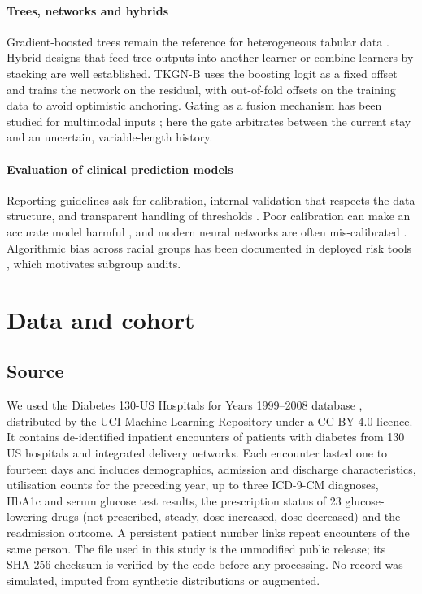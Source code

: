 \documentclass[preprint,12pt,authoryear]{elsarticle}
\begin{document}
\paragraph{Trees, networks and hybrids}
Gradient-boosted trees \citep{friedman2001,chen2016xgboost,ke2017lightgbm}
remain the reference for heterogeneous tabular data
\citep{grinsztajn2022}. Hybrid designs that feed tree outputs into another
learner \citep{he2014facebook} or combine learners by stacking
\citep{wolpert1992} are well established. TKGN-B uses the boosting logit
as a fixed offset and trains the network on the residual, with
out-of-fold offsets on the training data to avoid optimistic anchoring.
Gating as a fusion mechanism has been studied for multimodal inputs
\citep{arevalo2017gmu}; here the gate arbitrates between the current stay
and an uncertain, variable-length history.

\paragraph{Evaluation of clinical prediction models}
Reporting guidelines ask for calibration, internal validation that
respects the data structure, and transparent handling of thresholds
\citep{collins2015tripod}. Poor calibration can make an accurate model
harmful \citep{vancalster2019}, and modern neural networks are often
mis-calibrated \citep{guo2017}. Algorithmic bias across racial groups has
been documented in deployed risk tools \citep{obermeyer2019}, which
motivates subgroup audits.

\section{Data and cohort}
\label{sec:data}

\subsection{Source}
We used the Diabetes 130-US Hospitals for Years 1999--2008 database
\citep{strack2014,uci296}, distributed by the UCI Machine Learning
Repository under a CC BY 4.0 licence. It contains \NRaw{} de-identified
inpatient encounters of patients with diabetes from 130 US hospitals and
integrated delivery networks. Each encounter lasted one to fourteen days
and includes demographics, admission and discharge characteristics,
utilisation counts for the preceding year, up to three ICD-9-CM
diagnoses, HbA1c and serum glucose test results, the prescription status
of 23 glucose-lowering drugs (not prescribed, steady, dose increased, dose
decreased) and the readmission outcome. A persistent patient number links
repeat encounters of the same person. The file used in this study is the
unmodified public release; its SHA-256 checksum is verified by the code
before any processing. No record was simulated, imputed from synthetic
distributions or augmented.
\end{document}
